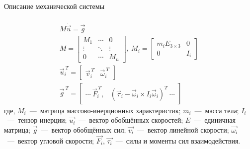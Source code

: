 \begin{frame}[t]{Описание механической системы}
    \framesubtitle{}
    \begin{align}
        \boxed{M \dot{\vec{u}} = \vec{g}}                                \\
        M = \begin{bmatrix}
                M_1    & \cdots & 0      \\
                \vdots & \ddots & \vdots \\
                0      & \cdots & M_n
            \end{bmatrix},\ M_i = \begin{bmatrix}
                                      m_i E_{3\times 3} & 0   \\
                                      0                 & I_i
                                  \end{bmatrix}        \\
        \vec{u}_i^{\ T} = \begin{bmatrix}
                              \vec{v}_i^{\ T} & \vec{\omega}_i^{\ T}
                          \end{bmatrix} \\
        \vec{g}^{\ T} = \begin{bmatrix}
                            \cdots \  \vec{F}_i^{\ T}, & (\vec{\tau}_i - \vec{\omega}_i \times I_i \vec{\omega}_i)^T\  \cdots
                        \end{bmatrix}
    \end{align}
    где, $M_i$~---~матрица массово-инерционных характеристик; $m_i$~---~масса тела; $I_i$~---~тензор инерции; $\vec{u_i}$~---~вектор обобщённых скоростей; $E$~---~единичная матрица; $\vec{g}$~---~вектор обобщённых сил; $\vec{v_i}$~---~вектор линейной скорости; $\vec{\omega_i}$~---~вектор угловой скорости; $\vec{F_i}$, $\vec{\tau_i}$~---~силы и моменты сил взаимодействия.
\end{frame}


